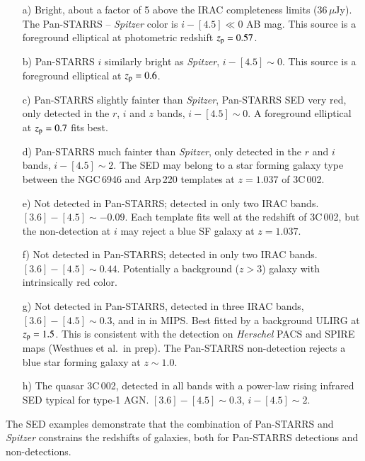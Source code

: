 \documentclass[mathleft,fleqn,%
]{an}
\begin{document}
\begin{itemize}
\item[a)] Bright, about a factor of 5 above the IRAC completeness
  limits (36\,$\mu$Jy). 
  The Pan-STARRS -- {\it Spitzer} color is $i - [4.5] \ll 0$ AB mag.
  This source is a foreground elliptical at photometric redshift
  $z_{\rm p} =0.57$.  

\item[b)] Pan-STARRS $i$ similarly bright as 
  {\it Spitzer}, $i - [4.5] \sim 0$. This source is a
  foreground elliptical at $z_{\rm p} =0.6$. 

\item[c)] Pan-STARRS slightly fainter than {\it Spitzer}, Pan-STARRS SED
  very red, only
  detected in the $r$, $i$ and $z$ bands, $i - [4.5] \sim 0$. 
  A foreground elliptical at $z_{\rm p} =0.7$ fits best.

\item[d)] Pan-STARRS much fainter than {\it Spitzer}, only
  detected in the $r$ and $i$ bands, $i - [4.5] \sim 2$.  
  The SED may belong to a star forming galaxy type between the NGC\,6946
  and Arp\,220 templates at $z=1.037$ of 3C\,002.

\item[e)] Not detected in Pan-STARRS; detected in only two IRAC
  bands. 
  $[3.6] - [4.5] \sim -0.09$. Each
  template fits well at the redshift of 3C\,002, but 
  the non-detection at $i$ may reject a blue SF galaxy at $z=1.037$.

\item[f)] Not detected in Pan-STARRS; detected in only two IRAC
  bands.
  $[3.6] - [4.5] \sim 0.44$. Potentially a 
  background ($z > 3$) galaxy with intrinsically red color.

\item[g)] Not detected in Pan-STARRS, 
  detected in three IRAC bands, 
  $[3.6] - [4.5] \sim 0.3$,  and in in MIPS. 
  Best fitted by 
  a background ULIRG at  $z_{\rm p} =1.5$. This is consistent with the
  detection on {\it Herschel} PACS and SPIRE maps (Westhues et al.\ in
  prep). The Pan-STARRS non-detection
  rejects a blue star forming galaxy at $z \sim 1.0$. 

\item[h)] The quasar 3C\,002, detected in all
  bands with a power-law rising infrared SED typical for type-1
  AGN. $[3.6] - [4.5] \sim 0.3$, $i - [4.5] \sim 2$.
\end{itemize}
The SED examples demonstrate that the combination of Pan-STARRS and
{\it Spitzer} constrains the redshifts of
galaxies, both for Pan-STARRS detections and non-detections. 
\end{document}
